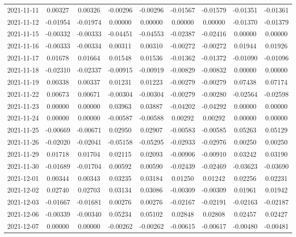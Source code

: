 {\begin{footnotesize}
\begin{longtable}{lcccccccc}
2021-11-11 & 0.00327 & 0.00326 & -0.00296 & -0.00296 & -0.01567 & -0.01579 & -0.01351 & -0.01361 \\
2021-11-12 & -0.01954 & -0.01974 & 0.00000 & 0.00000 & 0.00000 & 0.00000 & -0.01370 & -0.01379 \\
2021-11-15 & -0.00332 & -0.00333 & -0.04451 & -0.04553 & -0.02387 & -0.02416 & 0.00000 & 0.00000 \\
2021-11-16 & -0.00333 & -0.00334 & 0.00311 & 0.00310 & -0.00272 & -0.00272 & 0.01944 & 0.01926 \\
2021-11-17 & 0.01678 & 0.01664 & 0.01548 & 0.01536 & -0.01362 & -0.01372 & -0.01090 & -0.01096 \\
2021-11-18 & -0.02310 & -0.02337 & -0.00915 & -0.00919 & -0.00829 & -0.00832 & 0.00000 & 0.00000 \\
2021-11-19 & 0.00338 & 0.00337 & 0.01231 & 0.01223 & -0.00279 & -0.00279 & 0.07438 & 0.07174 \\
2021-11-22 & 0.00673 & 0.00671 & -0.00304 & -0.00304 & -0.00279 & -0.00280 & -0.02564 & -0.02598 \\
2021-11-23 & 0.00000 & 0.00000 & 0.03963 & 0.03887 & -0.04202 & -0.04292 & 0.00000 & 0.00000 \\
2021-11-24 & 0.00000 & 0.00000 & -0.00587 & -0.00588 & 0.00292 & 0.00292 & 0.00000 & 0.00000 \\
2021-11-25 & -0.00669 & -0.00671 & 0.02950 & 0.02907 & -0.00583 & -0.00585 & 0.05263 & 0.05129 \\
2021-11-26 & -0.02020 & -0.02041 & -0.05158 & -0.05295 & -0.02933 & -0.02976 & 0.00250 & 0.00250 \\
2021-11-29 & 0.01718 & 0.01704 & 0.02115 & 0.02093 & -0.00906 & -0.00910 & 0.03242 & 0.03190 \\
2021-11-30 & -0.01689 & -0.01704 & 0.00592 & 0.00590 & -0.02439 & -0.02469 & -0.03623 & -0.03690 \\
2021-12-01 & 0.00344 & 0.00343 & 0.03235 & 0.03184 & 0.01250 & 0.01242 & 0.02256 & 0.02231 \\
2021-12-02 & 0.02740 & 0.02703 & 0.03134 & 0.03086 & -0.00309 & -0.00309 & 0.01961 & 0.01942 \\
2021-12-03 & -0.01667 & -0.01681 & 0.00276 & 0.00276 & -0.02167 & -0.02191 & -0.02163 & -0.02187 \\
2021-12-06 & -0.00339 & -0.00340 & 0.05234 & 0.05102 & 0.02848 & 0.02808 & 0.02457 & 0.02427 \\
2021-12-07 & 0.00000 & 0.00000 & -0.00262 & -0.00262 & -0.00615 & -0.00617 & -0.00480 & -0.00481 \\

\end{longtable}
\end{footnotesize}}
